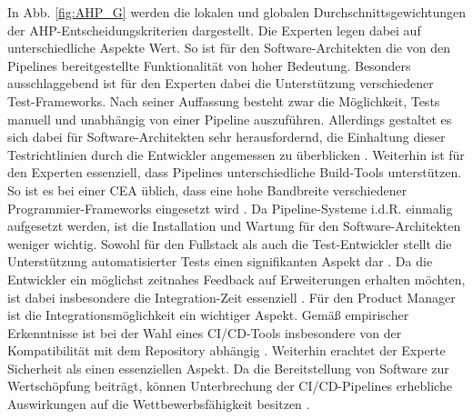 In Abb. \ref*{fig:AHP_G} werden die lokalen und globalen Durchschnittsgewichtungen der AHP-Entscheidungskriterien dargestellt. Die Experten legen dabei auf unterschiedliche Aspekte Wert. So ist für den Software-Architekten die von den Pipelines bereitgestellte Funktionalität von hoher Bedeutung. Besonders ausschlaggebend ist für den Experten dabei die Unterstützung verschiedener Test-Frameworks. Nach seiner Auffassung besteht zwar die Möglichkeit, Tests manuell und unabhängig von einer Pipeline auszuführen. Allerdings gestaltet es sich dabei für Software-Architekten sehr herausfordernd, die Einhaltung dieser Testrichtlinien durch die Entwickler angemessen zu überblicken \cite[Z. 16]{SoftwareArchitektSAPDTSIntegration.}. Weiterhin ist für den Experten essenziell, dass Pipelines unterschiedliche Build-Tools unterstützen. So ist es bei einer CEA üblich, dass eine hohe Bandbreite verschiedener Programmier-Frameworks eingesetzt wird \cite[Z. 11]{SoftwareArchitektSAPDTSIntegration.}. Da Pipeline-Systeme i.d.R. einmalig aufgesetzt werden, ist die Installation und Wartung für den Software-Architekten weniger wichtig. Sowohl für den Fullstack als auch die Test-Entwickler stellt die Unterstützung automatisierter Tests einen signifikanten Aspekt dar \cite[Z. 4]{BackendTestDeveloperSAPDTSIntegration.}. Da die Entwickler ein möglichst zeitnahes Feedback auf Erweiterungen erhalten möchten, ist dabei insbesondere die Integration-Zeit essenziell \cite[Z. 21]{TestDeveloperSAPHyperspaceAdoption&Onboarding.b}. Für den Product Manager ist die Integrationsmöglichkeit ein wichtiger Aspekt. Gemäß empirischer Erkenntnisse ist bei der Wahl eines CI/CD-Tools insbesondere von der Kompatibilität mit dem Repository abhängig \cite[Z. 3]{exp8}. Weiterhin erachtet der Experte Sicherheit als einen essenziellen Aspekt. Da die Bereitstellung von Software zur Wertschöpfung beiträgt, können Unterbrechung der CI/CD-Pipelines erhebliche Auswirkungen auf die Wettbewerbsfähigkeit besitzen \cite[Z. 6]{exp8}.   

